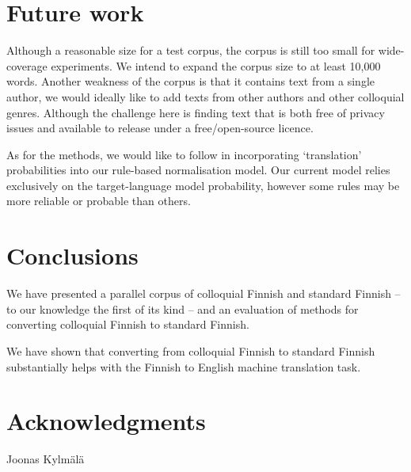 \documentclass[11pt]{article}
\begin{document}


\section{Future work}

Although a reasonable size for a test corpus, the corpus is still too small for 
wide-coverage experiments. We intend to expand the corpus size to at least 10,000
words. Another weakness of the corpus is that it contains text from a single author,
we would ideally like to add texts from other authors and other colloquial genres. Although
the challenge here is finding text that is both free of privacy issues and available
to release under a free/open-source licence.

As for the methods, we would like to follow  in incorporating
`translation' probabilities into our rule-based normalisation model. Our current model relies 
exclusively on the target-language model probability, however some rules may be more
reliable or probable than others.

\section{Conclusions}

We have presented a parallel corpus of colloquial Finnish and standard Finnish --
to our knowledge the first of its kind -- and an evaluation of methods for 
converting colloquial Finnish to standard Finnish. 

We have shown that converting from colloquial Finnish to standard Finnish substantially
helps with the Finnish to English machine translation task.

\section*{Acknowledgments}

Joonas Kylm\"{a}l\"{a}



\end{document}
